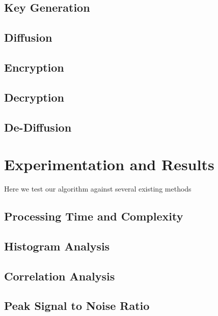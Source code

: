 \documentclass[conference]{IEEEtran}
\begin{document}
\subsection{Key Generation}\label{subsec:key-generation}

\subsection{Diffusion}\label{subsec:diffusion}

\subsection{Encryption}\label{subsec:encryption}

\subsection{Decryption}\label{subsec:decryption}

\subsection{De-Diffusion}\label{subsec:de-diffusion}

\section{Experimentation and Results}\label{sec:experimentation-and-results}

Here we test our algorithm against several existing methods

\subsection{Processing Time and Complexity}\label{subsec:processing-time-and-complexity}

\subsection{Histogram Analysis}\label{subsec:histogram-analysis}

\subsection{Correlation Analysis}\label{subsec:correlation-analysis}

\subsection{Peak Signal to Noise Ratio}\label{subsec:peak-signal-to-noise-ratio}
\end{document}
